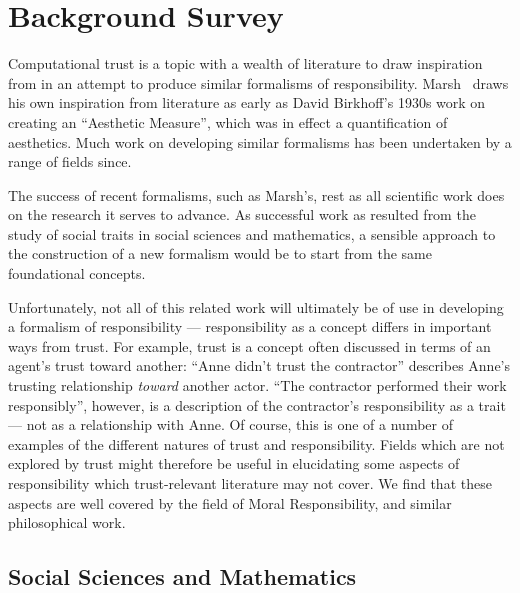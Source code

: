 \section{Background Survey}\label{sec:background_survey}

Computational trust is a topic with a wealth of literature to draw inspiration from in an attempt to produce similar formalisms of responsibility. Marsh~\cite{Marsh1994FormalisingConcept} draws his own inspiration from literature as early as David Birkhoff's 1930s work on creating an ``Aesthetic Measure'', which was in effect a quantification of aesthetics. Much work on developing similar formalisms has been undertaken by a range of fields since.\par

The success of recent formalisms, such as Marsh's, rest as all scientific work does on the research it serves to advance. As successful work as resulted from the study of social traits in social sciences and mathematics, a sensible approach to the construction of a new formalism would be to start from the same foundational concepts.\par

Unfortunately, not all of this related work will ultimately be of use in developing a formalism of responsibility --- responsibility as a concept differs in important ways from trust. For example, trust is a concept often discussed in terms of an agent's trust toward another: ``Anne didn't trust the contractor'' describes Anne's trusting relationship \emph{toward} another actor. ``The contractor performed their work responsibly'', however, is a description of the contractor's responsibility as a trait --- not as a relationship with Anne. Of course, this is one of a number of examples of the different natures of trust and responsibility. Fields which are not explored by trust might therefore be useful in elucidating some aspects of responsibility which trust-relevant literature may not cover. We find that these aspects are well covered by the field of Moral Responsibility, and similar philosophical work.

\subsection{Social Sciences and Mathematics}
